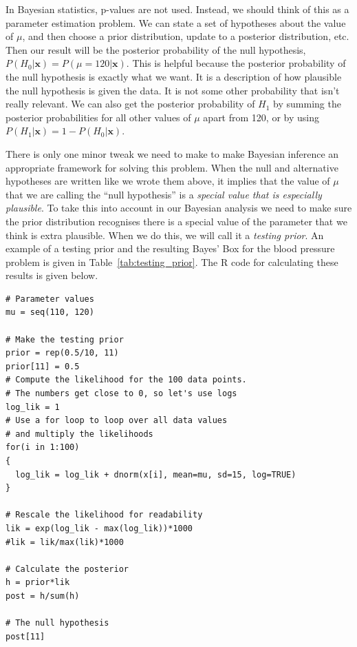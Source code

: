 In Bayesian statistics, p-values are not used. Instead, we should think of this
as a parameter estimation problem. We can state a set of hypotheses about the
value of $\mu$, and then choose a prior distribution, update to a posterior
distribution, etc. Then our result will be the posterior probability of the
null hypothesis, $P(H_0 | \boldsymbol{x}) = P(\mu = 120 | \boldsymbol{x})$.
This is helpful because the posterior probability of the null hypothesis is
exactly what we want. It is a description of how plausible the null hypothesis
is given the data. It is not some other probability that isn't really relevant.
We can also get the posterior probability of $H_1$ by summing the posterior
probabilities for all other values of $\mu$ apart from 120, or by using
$P(H_1 | \boldsymbol{x}) = 1 - P(H_0 | \boldsymbol{x})$.

There is only one minor tweak we need to make to make Bayesian inference an
appropriate framework for solving this problem. When the null and alternative
hypotheses are written like we wrote them above, it implies that the value of $\mu$
that we are calling the ``null hypothesis'' is a {\it special value that is
especially plausible}. To take this into account in our Bayesian analysis we
need to make sure the prior distribution recognises there is a special
value of the parameter that we think is extra plausible. When we do this, we
will call it a {\it testing prior}. An example of a testing prior and the
resulting Bayes' Box for
the blood pressure problem is given in Table~\ref{tab:testing_prior}.
The R code for calculating these results is given below.

\begin{verbatim}
# Parameter values
mu = seq(110, 120)

# Make the testing prior
prior = rep(0.5/10, 11)
prior[11] = 0.5
# Compute the likelihood for the 100 data points.
# The numbers get close to 0, so let's use logs
log_lik = 1
# Use a for loop to loop over all data values
# and multiply the likelihoods
for(i in 1:100)
{
  log_lik = log_lik + dnorm(x[i], mean=mu, sd=15, log=TRUE)
}

# Rescale the likelihood for readability
lik = exp(log_lik - max(log_lik))*1000
#lik = lik/max(lik)*1000

# Calculate the posterior
h = prior*lik
post = h/sum(h)

# The null hypothesis
post[11]
\end{verbatim}


